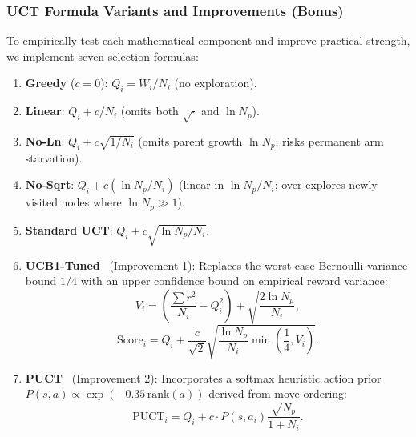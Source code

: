 \documentclass[conference]{IEEEtran}
\begin{document}
\subsubsection{UCT Formula Variants and Improvements (Bonus)}
To empirically test each mathematical component and improve practical strength, we implement seven selection formulas:
\begin{enumerate}
    \item \textbf{Greedy} ($c=0$): $Q_i = W_i/N_i$ (no exploration).
    \item \textbf{Linear}: $Q_i + c/N_i$ (omits both $\sqrt{\cdot}$ and $\ln N_p$).
    \item \textbf{No-Ln}: $Q_i + c\sqrt{1/N_i}$ (omits parent growth $\ln N_p$; risks permanent arm starvation).
    \item \textbf{No-Sqrt}: $Q_i + c(\ln N_p / N_i)$ (linear in $\ln N_p / N_i$; over-explores newly visited nodes where $\ln N_p \gg 1$).
    \item \textbf{Standard UCT}: $Q_i + c\sqrt{\ln N_p / N_i}$.
    \item \textbf{UCB1-Tuned}~\cite{auer2002} (Improvement 1): Replaces the worst-case Bernoulli variance bound $1/4$ with an upper confidence bound on empirical reward variance:
    \begin{equation}
    V_i = \left(\frac{\sum r^2}{N_i} - Q_i^2\right) + \sqrt{\frac{2 \ln N_p}{N_i}},
    \end{equation}
    \begin{equation}
    \mathrm{Score}_i = Q_i + \frac{c}{\sqrt{2}} \sqrt{\frac{\ln N_p}{N_i} \min\!\left(\frac{1}{4}, V_i\right)}.
    \end{equation}
    \item \textbf{PUCT}~\cite{silver2017} (Improvement 2): Incorporates a softmax heuristic action prior $P(s,a) \propto \exp(-0.35\,\mathrm{rank}(a))$ derived from move ordering:
    \begin{equation}
    \mathrm{PUCT}_i = Q_i + c \cdot P(s, a_i) \frac{\sqrt{N_p}}{1 + N_i}.
    \end{equation}
\end{enumerate}
\end{document}
